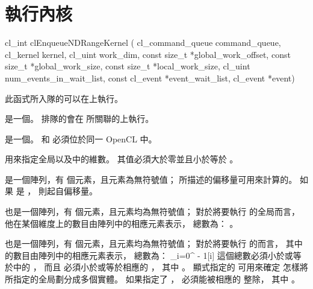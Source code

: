 \section{執行內核}


\startCLFUNC
cl_int clEnqueueNDRangeKernel (
			cl_command_queue command_queue,
			cl_kernel kernel,
			cl_uint work_dim,
			const size_t *global_work_offset,
			const size_t *global_work_size,
			const size_t *local_work_size,
			cl_uint num_events_in_wait_list,
			const cl_event *event_wait_list,
			cl_event *event)
\stopCLFUNC

此函式所入隊的可以在上執行。

 是一個。
排隊的會在  所關聯的上執行。

 是一個。
 和  必須位於同一 OpenCL 中。

 用來指定全局以及中的維數。
其值必須大於零並且小於等於 。

 是一個陣列，有  個元素，且元素為無符號值；
所描述的偏移量可用來計算的。
如果  是 ，
則起自偏移量。

 也是一個陣列，有  個元素，且元素均為無符號值；
對於將要執行  的全局而言，
他在某個維度上的數目由陣列中的相應元素表示，
總數為：
\startformula
{}。
\stopformula

 也是一個陣列，有  個元素，且元素均為無符號值；
對於將要執行  的而言，
其中的數目由陣列中的相應元素表示，
總數為：
\startformula
\prod_{i=0}^{ - 1}[i]
\stopformula
這個總數必須小於或等於中的 ，
而且  必須小於或等於相應的
，
其中 。
顯式指定的  可用來確定
怎樣將  所指定的全局劃分成多個實體。
如果指定了 ，
 必須能被相應的
 整除，
其中 。

